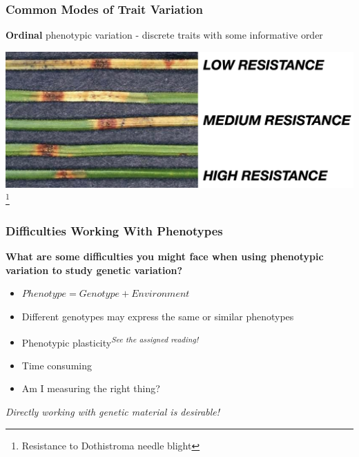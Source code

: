 \documentclass{beamer}
\newcommand\blfootnote[1]{%
	\begingroup
	\renewcommand\thefootnote{}\footnote{#1}%
	\addtocounter{footnote}{-1}%
	\endgroup
}
\begin{document}
\begin{frame}
	
	\frametitle{Common Modes of Trait Variation}
	
	\textbf{Ordinal} phenotypic variation - discrete traits with some informative order \\
	\vspace{10pt}
	
	\centering \includegraphics[keepaspectratio, width  = \textwidth]{img/dothistromaResistance}\\
	
	\blfootnote{Resistance to Dothistroma needle blight}
	
	
\end{frame}


\begin{frame}
	\frametitle{Difficulties Working With Phenotypes}
\textbf{	What are some difficulties you might face when using phenotypic variation to study genetic variation? \pause}
	\vspace{10pt}
	\begin{itemize}
		\item $Phenotype = Genotype + Environment$
		\item Different genotypes may express the same or similar phenotypes
		\item Phenotypic plasticity\textsuperscript{\textit{See the assigned reading!}}
		\item Time consuming
		\item Am I measuring the right thing? 
	\end{itemize}
	
	\pause
	\vspace{20pt}
\textit{	Directly working with genetic material is desirable!}
\end{frame}			
\end{document}

